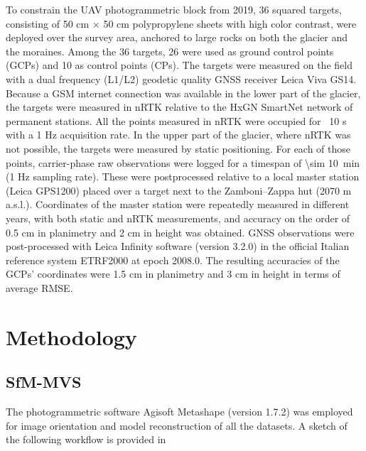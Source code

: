 To constrain the UAV photogrammetric block from 2019, 36 squared targets, consisting
of 50 cm × 50 cm polypropylene sheets with high color contrast, were deployed over the
survey area, anchored to large rocks on both the glacier and the moraines. Among the
36 targets, 26 were used as ground control points (GCPs) and 10 as control points (CPs).
The targets were measured on the field with a dual frequency (L1/L2) geodetic quality
GNSS receiver Leica Viva GS14. Because a GSM internet connection was available in the lower
part of the glacier, the targets were measured in nRTK relative to the HxGN SmartNet
network of permanent stations. All the points measured in nRTK were occupied for ~10 s
with a 1 Hz acquisition rate. In the upper part of the glacier, where nRTK was not possible,
the targets were measured by static positioning. For each of those points, carrier-phase
raw observations were logged for a timespan of \SI{\sim 10}{\minute} (1 Hz sampling rate).
These were postprocessed relative to a local master station (Leica GPS1200) placed 
over a target next to the Zamboni–Zappa hut (2070 m a.s.l.). 
Coordinates of the master station were repeatedly measured in different years, with both
static and nRTK measurements, and accuracy on the order of 0.5 cm in planimetry and 2 cm 
in height was obtained. 
GNSS observations were post-processed with Leica Infinity software (version 3.2.0) in the official Italian reference system ETRF2000 at epoch 2008.0. 
The resulting accuracies of the GCPs' coordinates were 1.5 cm in planimetry and 3 cm in height in terms of average RMSE.

\section{Methodology}\label{sec:2:methods}

\subsection{SfM-MVS}

The photogrammetric software Agisoft Metashape (version 1.7.2) was employed for image orientation and model reconstruction of all the datasets. A sketch of the following
workflow is provided in 

